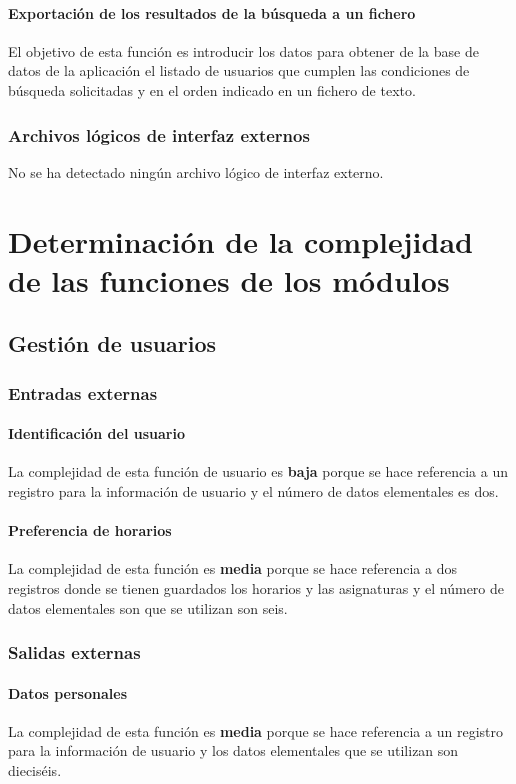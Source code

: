 \documentclass[11pt,a4paper,spanish,twoside]{book}
\begin{document}
\subsubsection{Exportación de los resultados de la búsqueda a un fichero}
El objetivo de esta función es introducir los datos para obtener de la base
de datos de la aplicación el listado de usuarios que cumplen las condiciones de
búsqueda solicitadas y en el orden indicado en un fichero de texto.

\subsection{Archivos lógicos de interfaz externos}
No se ha detectado ningún archivo lógico de interfaz externo.

\chapter{Determinación de la complejidad de las funciones de los 
  módulos}
\section{Gestión de usuarios}
\subsection{Entradas externas}
\subsubsection{Identificación del usuario}
La complejidad de esta función de usuario es \textbf{baja} porque se hace
referencia a un registro para la información de usuario y el número de datos
elementales es dos. 

\subsubsection{Preferencia de horarios} 
La complejidad de esta función es \textbf{media} porque se hace
referencia a dos registros donde se tienen guardados los horarios y las
asignaturas y el número de datos elementales son que se utilizan son seis. 

\subsection{Salidas externas}
\subsubsection{Datos personales}
La complejidad de esta función es \textbf{media} porque se hace referencia a
un registro para la información de usuario y los datos elementales que se
utilizan son dieciséis.
\end{document}
